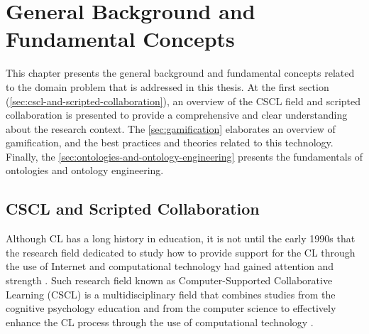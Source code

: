 
\chapter{General Background and Fundamental Concepts}
\label{chapter:general-background}

This chapter presents the general background and fundamental concepts related to the domain problem that is addressed in this thesis. At the first section (\autoref{sec:cscl-and-scripted-collaboration}), an overview of the CSCL field and scripted collaboration is presented to provide a comprehensive and clear understanding about the research context. %
The \autoref{sec:gamification} elaborates an overview of gamification, and the best practices and theories related to this technology. %
Finally, the \autoref{sec:ontologies-and-ontology-engineering} presents the fundamentals of ontologies and ontology engineering.%

\section{CSCL and Scripted Collaboration}
\label{sec:cscl-and-scripted-collaboration}

Although CL has a long history in education, it is not until the early 1990s that the research field dedicated to study how to provide support for the CL through the use of Internet and computational technology had gained attention and strength \cite{StahlKoschmannSuthers2006}. Such research field known as Computer-Supported Collaborative Learning (CSCL) is a multidisciplinary field that combines studies from the cognitive psychology education and from the computer science to effectively enhance the CL process through the use of computational technology \cite{HoppeOgataSoller2007}.

